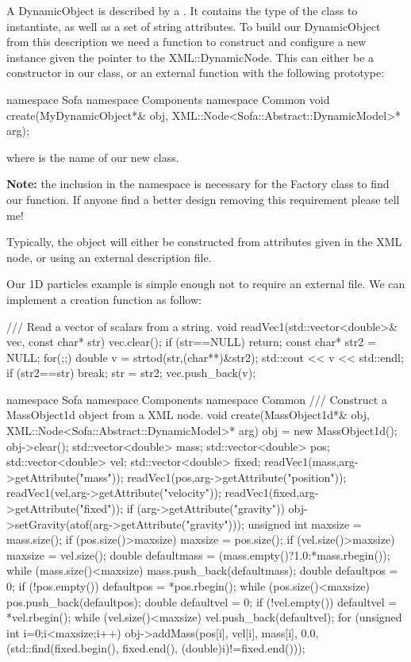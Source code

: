 A DynamicObject is described by a . It contains the type of the class to instantiate, as well as a set of string attributes. To build our DynamicObject from this description we need a function to construct and configure a new instance given the pointer to the XML::DynamicNode. This can either be a constructor in our class, or an external function with the following prototype:
\begin{code_cpp}
namespace Sofa { namespace Components { namespace Common {
void create(MyDynamicObject*& obj, XML::Node<Sofa::Abstract::DynamicModel>* arg);
} } }
\end{code_cpp}
where  is the name of our new class.

\textbf{Note:} the inclusion in the  namespace is necessary for the Factory class to find our function. If anyone find a better design removing this requirement please tell me!

Typically, the object will either be constructed from attributes given in the XML node, or using an external description file.

Our 1D particles example is simple enough not to require an external file. We can implement a creation function as follow:

\begin{code_cpp}
/// Read a vector of scalars from a string.
void readVec1(std::vector<double>& vec, const char* str)
{
  vec.clear();
  if (str==NULL) return;
  const char* str2 = NULL;
  for(;;)
  {
    double v = strtod(str,(char**)&str2);
    std::cout << v << std::endl;
    if (str2==str) break;
    str = str2;
    vec.push_back(v);
  }
}

namespace Sofa { namespace Components { namespace Common {
/// Construct a MassObject1d object from a XML node.
void create(MassObject1d*& obj, XML::Node<Sofa::Abstract::DynamicModel>* arg)
{
        obj = new MassObject1d();
  obj->clear();
  std::vector<double> mass;
  std::vector<double> pos;
  std::vector<double> vel;
  std::vector<double> fixed;
  readVec1(mass,arg->getAttribute("mass"));
  readVec1(pos,arg->getAttribute("position"));
  readVec1(vel,arg->getAttribute("velocity"));
  readVec1(fixed,arg->getAttribute("fixed"));
  if (arg->getAttribute("gravity"))
  {
    obj->setGravity(atof(arg->getAttribute("gravity")));
  }
  unsigned int maxsize = mass.size();
  if (pos.size()>maxsize) maxsize = pos.size();
  if (vel.size()>maxsize) maxsize = vel.size();
  double defaultmass = (mass.empty()?1.0:*mass.rbegin());
  while (mass.size()<maxsize)
    mass.push_back(defaultmass);
  double defaultpos = 0;
  if (!pos.empty()) defaultpos = *pos.rbegin();
  while (pos.size()<maxsize)
    pos.push_back(defaultpos);
  double defaultvel = 0;
  if (!vel.empty()) defaultvel = *vel.rbegin();
  while (vel.size()<maxsize)
    vel.push_back(defaultvel);
  for (unsigned int i=0;i<maxsize;i++)
  {
    obj->addMass(pos[i], vel[i], mass[i], 0.0,
      (std::find(fixed.begin(), fixed.end(), (double)i)!=fixed.end()));
  }
} } } }
\end{code_cpp}

